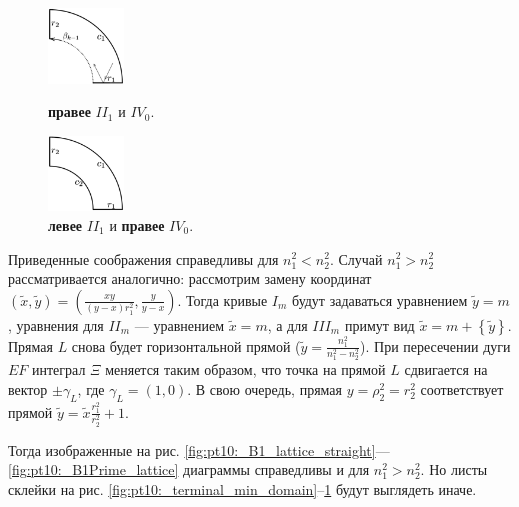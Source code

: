 \begin{statement}
\begin{figure}[!htb]
\centering
\includegraphics[width=2cm]{images/section3_circular/atoms/branching/B1Prime_max_domain.pdf}
    \caption{\textbf{правее} $II_1$ и $IV_0$.}
    \label{fig:pt10:_terminal_max_domain_B1Prime}
\endminipage\hfill
{}
\centering
\includegraphics[width=2cm]{images/section3_circular/atoms/branching/sect3_C1_domain_prime.pdf}
    \caption{\textbf{левее} $II_1$ и  \textbf{правее} $IV_0$.}
    \label{fig:pt10:_C1_domainPrime}
\endminipage\hfill
\end{figure}
\label{st:stat_leaf_shapes}
\end{statement}



\begin{remark}
Приведенные соображения справедливы для $n_1^2 < n_2^2$. Случай  $n_1^2 > n_2^2$ рассматривается аналогично: рассмотрим замену координат $(\widetilde{x}, \widetilde{y}) = \left( \frac{xy}{(y-x)r_1^2}, \frac{y}{y-x}\right)$. Тогда кривые $I_m$ будут задаваться уравнением $\widetilde{y} = m$, уравнения для $II_m$ --- уравнением $\widetilde{x} = m$, а для  $III_m$ примут вид $\widetilde{x} = m + \left\{\widetilde{y}\right\}$. Прямая $L$ снова будет горизонтальной прямой ($\widetilde{y} = \frac{n_1^2}{n_1^2-n_2^2}$). 
При пересечении дуги $EF$ интеграл $\Xi$ меняется таким образом, что точка на прямой $L$ сдвигается на вектор $\pm \gamma_L$, где $\gamma_L = (1,0)$. В свою очередь, прямая $y=\rho_2^2 = r_2^2$ соответствует прямой $\widetilde{y} = \widetilde{x} \frac{r_1^2}{r_2^2} + 1$. 

Тогда изображенные на  рис. \ref{fig:pt10:_B1_lattice_straight}---\ref{fig:pt10:_B1Prime_lattice} диаграммы справедливы и для $n_1^2 > n_2^2$. Но листы склейки на рис. 
 \ref{fig:pt10:_terminal_min_domain}--\ref{fig:pt10:_C1_domainPrime} будут выглядеть иначе.
\label{rem:diagram_reuse}
\end{remark}


